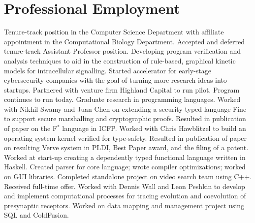 \section{Professional Employment}
  {Tenure-track position in the Computer Science Department with affiliate appointment in the Computational Biology Department.}
  {Accepted and deferred tenure-track Assistant Professor position.}
  {Developing program verification and analysis techniques to aid in the construction of rule-based, graphical kinetic models for intracellular signalling.}
  {Started accelerator for early-stage cybersecurity companies with the goal of turning more research ideas into startups. Partnered with venture firm Highland Capital to run pilot. Program continues to run today.}
  {Graduate research in programming languages.}
  {Worked with Nikhil Swamy and Juan Chen on extending a security-typed language Fine to support secure marshalling and cryptographic proofs. Resulted in publication of paper on the F$^*$ language in ICFP.}
  {Worked with Chris Hawblitzel to build an operating system kernel verified for type-safety. Resulted in publication of paper on resulting Verve system in PLDI, Best Paper award, and the filing of a patent.}
  {}{Worked at start-up creating a dependently typed functional language written in Haskell.  Created parser for core language; wrote compiler optimizations; worked on GUI libraries.}
  {Completed standalone project on video search team using C++.  Received full-time offer.}
  {Worked with Dennis Wall and Leon Peshkin to develop and implement computational processes for tracing evolution and coevolution of presynaptic receptors.}
  {}{Worked on data mapping and management project using SQL and ColdFusion.}

